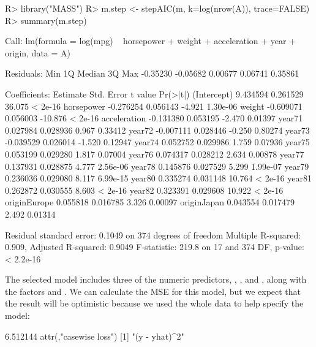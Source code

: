 \documentclass[
]{jss}
\begin{document}
\begin{CodeChunk}
\begin{CodeInput}
R> library("MASS")
R> m.step <- stepAIC(m, k=log(nrow(A)), trace=FALSE)
R> summary(m.step)
\end{CodeInput}
\begin{CodeOutput}

Call:
lm(formula = log(mpg) ~ horsepower + weight + acceleration + 
    year + origin, data = A)

Residuals:
     Min       1Q   Median       3Q      Max 
-0.35230 -0.05682  0.00677  0.06741  0.35861 

Coefficients:
              Estimate Std. Error t value Pr(>|t|)
(Intercept)   9.434594   0.261529  36.075  < 2e-16
horsepower   -0.276254   0.056143  -4.921 1.30e-06
weight       -0.609071   0.056003 -10.876  < 2e-16
acceleration -0.131380   0.053195  -2.470  0.01397
year71        0.027984   0.028936   0.967  0.33412
year72       -0.007111   0.028446  -0.250  0.80274
year73       -0.039529   0.026014  -1.520  0.12947
year74        0.052752   0.029986   1.759  0.07936
year75        0.053199   0.029280   1.817  0.07004
year76        0.074317   0.028212   2.634  0.00878
year77        0.137931   0.028875   4.777 2.56e-06
year78        0.145876   0.027529   5.299 1.99e-07
year79        0.236036   0.029080   8.117 6.99e-15
year80        0.335274   0.031148  10.764  < 2e-16
year81        0.262872   0.030555   8.603  < 2e-16
year82        0.323391   0.029608  10.922  < 2e-16
originEurope  0.055818   0.016785   3.326  0.00097
originJapan   0.043554   0.017479   2.492  0.01314

Residual standard error: 0.1049 on 374 degrees of freedom
Multiple R-squared:  0.909, Adjusted R-squared:  0.9049 
F-statistic: 219.8 on 17 and 374 DF,  p-value: < 2.2e-16
\end{CodeOutput}
\end{CodeChunk}

The selected model includes three of the numeric predictors,
, , and , along with
the factors  and . We can calculate the MSE for
this model, but we expect that the result will be optimistic because we
used the whole data to help specify the model:

\begin{CodeChunk}
\begin{CodeOutput}
[1] 6.512144
attr(,"casewise loss")
[1] "(y - yhat)^2"
\end{CodeOutput}
\end{CodeChunk}
\end{document}
